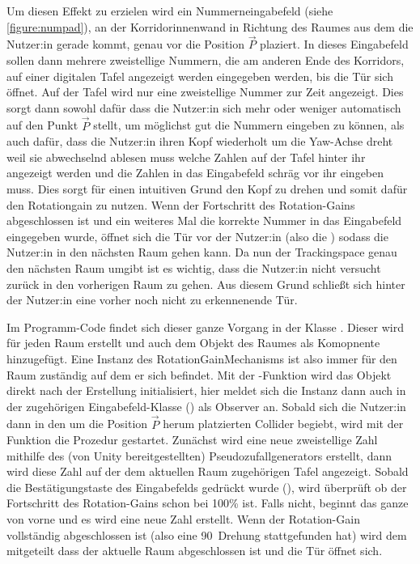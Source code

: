 Um diesen Effekt zu erzielen wird ein Nummerneingabefeld (siehe \autoref{figure:numpad}), an der Korridorinnenwand in Richtung des Raumes aus dem die Nutzer:in gerade kommt, genau vor die Position $\vec{P}$ plaziert. In dieses Eingabefeld sollen dann mehrere zweistellige Nummern, die am anderen Ende des Korridors, auf einer digitalen Tafel angezeigt werden eingegeben werden, bis die Tür sich öffnet. Auf der Tafel wird nur eine zweistellige Nummer zur Zeit angezeigt.
Dies sorgt dann sowohl dafür dass die Nutzer:in sich mehr oder weniger automatisch auf den Punkt $\vec{P}$ stellt, um möglichst gut die Nummern eingeben zu können, als auch dafür, dass die Nutzer:in ihren Kopf wiederholt um die Yaw-Achse dreht weil sie abwechselnd ablesen muss welche Zahlen auf der Tafel hinter ihr angezeigt werden und die Zahlen in das Eingabefeld schräg vor ihr eingeben muss. Dies sorgt für einen intuitiven Grund den Kopf zu drehen und somit dafür den Rotationgain zu nutzen. Wenn der Fortschritt des Rotation-Gains abgeschlossen ist und ein weiteres Mal die korrekte Nummer in das Eingabefeld eingegeben wurde, öffnet sich die Tür vor der Nutzer:in (also die ) sodass die Nutzer:in in den nächsten Raum gehen kann. Da nun der Trackingspace genau den nächsten Raum umgibt ist es wichtig, dass die Nutzer:in nicht versucht zurück in den vorherigen Raum zu gehen. Aus diesem Grund schließt sich hinter der Nutzer:in eine vorher noch nicht zu erkennenende Tür.

Im Programm-Code findet sich dieser ganze Vorgang in der Klasse . Dieser wird für jeden Raum erstellt und auch dem Objekt des Raumes als Komopnente hinzugefügt. Eine Instanz des RotationGainMechanisms ist also immer für den Raum zuständig auf dem er sich befindet. Mit der -Funktion wird das Objekt direkt nach der Erstellung initialisiert, hier meldet sich die Instanz dann auch in der zugehörigen Eingabefeld-Klasse () als Observer an. Sobald sich die Nutzer:in dann in den um die Position $\vec{P}$ herum platzierten Collider begiebt, wird mit der Funktion  die Prozedur gestartet. Zunächst wird eine neue zweistellige Zahl mithilfe des (von Unity bereitgestellten) Pseudozufallgenerators erstellt, dann wird diese Zahl auf der dem aktuellen Raum zugehörigen Tafel angezeigt. Sobald die Bestätigungstaste des Eingabefelds gedrückt wurde (\textquote{$\#$}), wird überprüft ob der Fortschritt des Rotation-Gains schon bei 100\% ist. Falls nicht, beginnt das ganze von vorne und es wird eine neue Zahl erstellt. Wenn der Rotation-Gain vollständig abgeschlossen ist (also eine 90\textdegree\ Drehung stattgefunden hat) wird dem  mitgeteilt dass der aktuelle Raum abgeschlossen ist und die Tür öffnet sich.

